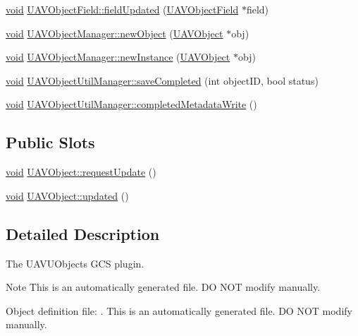 \begin{DoxyCompactItemize}
\item 
\hyperlink{group___u_a_v_objects_plugin_ga444cf2ff3f0ecbe028adce838d373f5c}{void} \hyperlink{group___u_a_v_objects_plugin_ga03a1f1534e4c805d091fc17e9ab5ad14}{\-U\-A\-V\-Object\-Field\-::field\-Updated} (\hyperlink{class_u_a_v_object_field}{\-U\-A\-V\-Object\-Field} $\ast$field)
\item 
\hyperlink{group___u_a_v_objects_plugin_ga444cf2ff3f0ecbe028adce838d373f5c}{void} \hyperlink{group___u_a_v_objects_plugin_gaf8c983e30ce7ebac3d4ef742d427b8fe}{\-U\-A\-V\-Object\-Manager\-::new\-Object} (\hyperlink{class_u_a_v_object}{\-U\-A\-V\-Object} $\ast$obj)
\item 
\hyperlink{group___u_a_v_objects_plugin_ga444cf2ff3f0ecbe028adce838d373f5c}{void} \hyperlink{group___u_a_v_objects_plugin_ga7787ebe5de616d95116d5a4b360b6773}{\-U\-A\-V\-Object\-Manager\-::new\-Instance} (\hyperlink{class_u_a_v_object}{\-U\-A\-V\-Object} $\ast$obj)
\item 
\hyperlink{group___u_a_v_objects_plugin_ga444cf2ff3f0ecbe028adce838d373f5c}{void} \hyperlink{group___u_a_v_objects_plugin_ga34993cd463a734315dd04903a4e2de24}{\-U\-A\-V\-Object\-Util\-Manager\-::save\-Completed} (int object\-I\-D, bool status)
\item 
\hyperlink{group___u_a_v_objects_plugin_ga444cf2ff3f0ecbe028adce838d373f5c}{void} \hyperlink{group___u_a_v_objects_plugin_gaf343ab5f4e4710c85cd7977ae7563ca1}{\-U\-A\-V\-Object\-Util\-Manager\-::completed\-Metadata\-Write} ()
\end{DoxyCompactItemize}
\subsection*{\-Public \-Slots}
\begin{DoxyCompactItemize}
\item 
\hyperlink{group___u_a_v_objects_plugin_ga444cf2ff3f0ecbe028adce838d373f5c}{void} \hyperlink{group___u_a_v_objects_plugin_ga6018820b37db308fb1ee1b3c3ff4f9a0}{\-U\-A\-V\-Object\-::request\-Update} ()
\item 
\hyperlink{group___u_a_v_objects_plugin_ga444cf2ff3f0ecbe028adce838d373f5c}{void} \hyperlink{group___u_a_v_objects_plugin_ga295ff9d6b0c01a6a8809a4cf9eb027cc}{\-U\-A\-V\-Object\-::updated} ()
\end{DoxyCompactItemize}


\subsection{\-Detailed \-Description}
\-The \-U\-A\-V\-U\-Objects \-G\-C\-S plugin. \begin{DoxyNote}{\-Note}
\-This is an automatically generated file. \-D\-O \-N\-O\-T modify manually.

\-Object definition file\-: . \-This is an automatically generated file. \-D\-O \-N\-O\-T modify manually. 
\end{DoxyNote}



